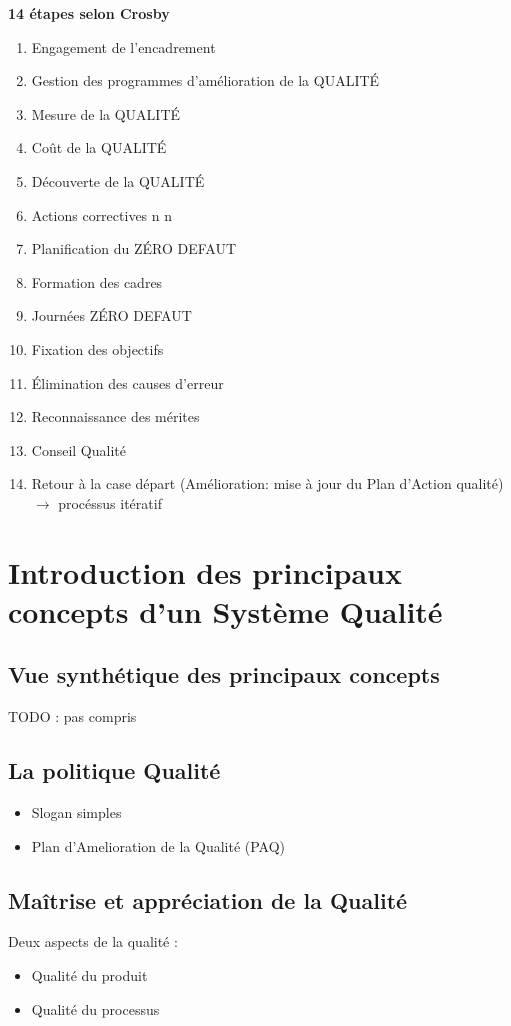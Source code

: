 \textbf{14 étapes selon Crosby}
\begin{enumerate}
\item Engagement de l'encadrement
\item Gestion des programmes d'amélioration de la QUALITÉ
\item Mesure de la QUALITÉ
\item Coût de la QUALITÉ
\item Découverte de la QUALITÉ
\item Actions correctives n n %
\item Planification du ZÉRO DEFAUT
\item Formation des cadres 
\item Journées ZÉRO DEFAUT 
\item Fixation des objectifs
\item Élimination des causes d'erreur
\item Reconnaissance des mérites
\item Conseil Qualité
\item Retour à la case départ (Amélioration: mise à jour du Plan d'Action qualité) $\rightarrow$ procéssus itératif
\end{enumerate}


\section{Introduction des principaux concepts d'un Système Qualité}

	\subsection{Vue synthétique des principaux concepts}
TODO : pas compris %

	\subsection{La politique Qualité}
	\begin{itemize}
	\item Slogan simples
	\item Plan d’Amelioration de la Qualité (PAQ)
	\end{itemize}

	\subsection{Maîtrise et appréciation de la Qualité}
Deux aspects de la qualité :
	\begin{itemize}
	\item Qualité du produit
	\item Qualité du processus
	\end{itemize}

